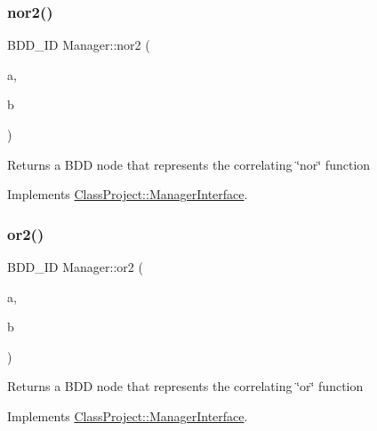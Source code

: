 \subsubsection{\texorpdfstring{nor2()}{nor2()}}
{\footnotesize\ttfamily B\+D\+D\+\_\+\+ID Manager\+::nor2 (\begin{DoxyParamCaption}\item[{const B\+D\+D\+\_\+\+ID}]{a,  }\item[{const B\+D\+D\+\_\+\+ID}]{b }\end{DoxyParamCaption})\hspace{0.3cm}{\ttfamily [virtual]}}

\begin{DoxyReturn}{Returns}
a B\+DD node that represents the correlating \char`\"{}nor\char`\"{} function 
\end{DoxyReturn}


Implements \hyperlink{classClassProject_1_1ManagerInterface_a312d9865eae2d6355e17855cba78bc78}{Class\+Project\+::\+Manager\+Interface}.

\mbox{\label{classClassProject_1_1Manager_a0f415b7af83a3efb6f7020650e68f1c3}} 
\subsubsection{\texorpdfstring{or2()}{or2()}}
{\footnotesize\ttfamily B\+D\+D\+\_\+\+ID Manager\+::or2 (\begin{DoxyParamCaption}\item[{const B\+D\+D\+\_\+\+ID}]{a,  }\item[{const B\+D\+D\+\_\+\+ID}]{b }\end{DoxyParamCaption})\hspace{0.3cm}{\ttfamily [virtual]}}

\begin{DoxyReturn}{Returns}
a B\+DD node that represents the correlating \char`\"{}or\char`\"{} function 
\end{DoxyReturn}


Implements \hyperlink{classClassProject_1_1ManagerInterface_a8dbfde761b1e94d1f222b4d27f3c6fbc}{Class\+Project\+::\+Manager\+Interface}.

\mbox{\label{classClassProject_1_1Manager_a8ddf48759e4e3a5c9e92b07470372b7e}} 
